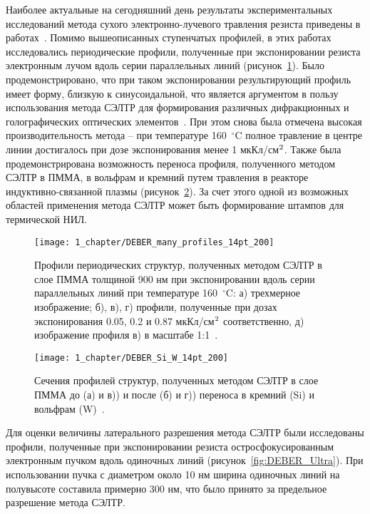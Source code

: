 Наиболее актуальные на сегодняшний день результаты экспериментальных исследований метода сухого электронно-лучевого травления резиста приведены в работах~\cite{Bruk_2015_co, Bruk_2016_mee}. Помимо вышеописанных ступенчатых профилей, в этих работах исследовались периодические профили, полученные при экспонировании резиста электронным лучом вдоль серии параллельных линий (рисунок~\ref{fig:DEBER_many_profiles}). Было продемонстрировано, что при таком экспонировании результирующий профиль имеет форму, близкую к синусоидальной, что является аргументом в пользу использования метода СЭЛТР для формирования различных дифракционных и голографических оптических элементов~\cite{Mitreska_sin_gratings}. При этом снова была отмечена высокая производительность метода -- при температуре 160~$^\circ$C полное травление в центре линии достигалось при дозе экспонирования менее 1 мкКл/см$^\text{2}$. Также была продемонстрирована возможность переноса профиля, полученного методом СЭЛТР в ПММА, в вольфрам и кремний путем травления в реакторе индуктивно-связанной плазмы (рисунок~\ref{fig:DEBER_Si_W}). За счет этого одной из возможных областей применения метода СЭЛТР может быть формирование штампов для термической НИЛ.

\begin{figure}[h]
	\centering
	\vspace{0.2em}
	\texttt{[image: 1\_chapter/DEBER\_many\_profiles\_14pt\_200]}
	\vspace{0.2em}
	\caption{Профили периодических структур, полученных методом СЭЛТР в слое ПММА толщиной 900 нм при экспонировании вдоль серии параллельных линий при температуре 160~$^\circ$C: а) трехмерное изображение; б), в), г) профили, полученные при дозах экспонирования 0.05, 0.2 и 0.87 мкКл/см$^\text{2}$ соответственно, д) изображение профиля в) в масштабе 1:1~\cite{Bruk_2016_mee}.}
	\label{fig:DEBER_many_profiles}
\end{figure}

\begin{figure}[t]
	\centering
	\texttt{[image: 1\_chapter/DEBER\_Si\_W\_14pt\_200]}
	\vspace{0.2em}
	\caption{Сечения профилей структур, полученных методом СЭЛТР в слое ПММА до (а) и в)) и после (б) и г)) переноса в кремний (Si) и вольфрам (W)~\cite{Bruk_2016_mee}.}
	\label{fig:DEBER_Si_W}
\end{figure}

Для оценки величины латерального разрешения метода СЭЛТР были исследованы профили, полученные при экспонировании резиста остросфокусированным электронным пучком вдоль одиночных линий (рисунок~\ref{fig:DEBER_Ultra}).
При использовании пучка с диаметром около 10 нм ширина одиночных линий на полувысоте составила примерно 300 нм, что было принято за предельное разрешение метода СЭЛТР.

